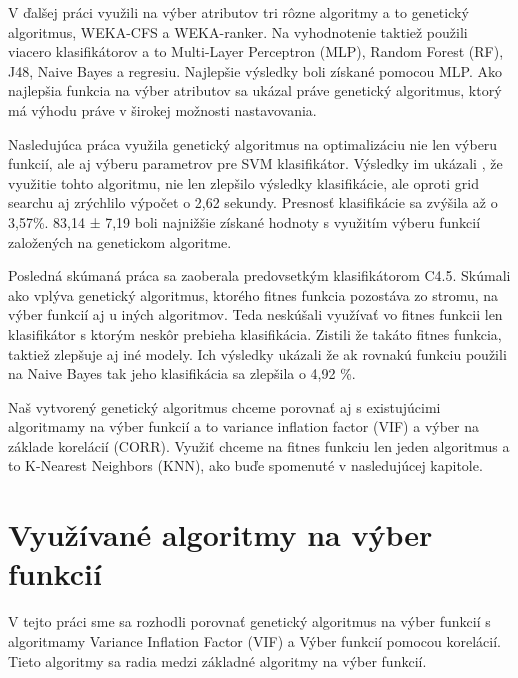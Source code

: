 \documentclass[runningheads]{llncs}
\begin{document}
V ďalšej práci\cite{ref_babatunde} využili na výber atributov tri rôzne algoritmy a to 
genetický algoritmus, WEKA-CFS a WEKA-ranker. Na vyhodnotenie taktiež použili viacero klasifikátorov
a to Multi-Layer Perceptron (MLP), Random Forest (RF), J48, Naive Bayes a regresiu. Najlepšie výsledky 
boli získané pomocou MLP. Ako najlepšia funkcia na výber atributov sa ukázal práve genetický algoritmus,
ktorý má výhodu práve v širokej možnosti nastavovania.

Nasledujúca práca\cite{ref_zhao} využila genetický algoritmus na optimalizáciu nie 
len výberu funkcií, ale aj výberu parametrov pre SVM klasifikátor. Výsledky im ukázali
, že využitie tohto algoritmu, nie len zlepšilo výsledky klasifikácie, 
ale oproti  grid searchu aj zrýchlilo výpočet o 2,62 sekundy.
Presnosť klasifikácie sa zvýšila až o 3,57\%. 83,14 ± 7,19 boli najnižšie 
získané hodnoty s využitím výberu funkcií založených na genetickom algoritme.

Posledná skúmaná práca \cite{ref_smith} sa zaoberala predovsetkým klasifikátorom C4.5.
Skúmali ako vplýva genetický algoritmus, ktorého fitnes funkcia pozostáva zo stromu, 
na výber funkcií aj u iných algoritmov. Teda neskúšali využívať vo fitnes funkcii len
klasifikátor s ktorým neskôr prebieha klasifikácia. Zistili že takáto fitnes funkcia,
taktiež zlepšuje aj iné modely. Ich výsledky ukázali že ak rovnakú funkciu použili na 
Naive Bayes tak jeho klasifikácia sa zlepšila o 4,92 \%.

Naš vytvorený genetický algoritmus chceme porovnať aj s existujúcimi algoritmamy na výber 
funkcií a to variance inflation factor (VIF) a výber na základe korelácií (CORR). Využiť chceme
na fitnes funkciu len jeden algoritmus a to K-Nearest Neighbors (KNN), ako buďe spomenuté v nasledujúcej kapitole.


\section{Využívané algoritmy na výber funkcií}
V tejto práci sme sa rozhodli porovnať genetický algoritmus na výber funkcií s
algoritmamy Variance Inflation Factor (VIF) a Výber funkcií pomocou korelácií. Tieto 
algoritmy sa radia medzi základné algoritmy na výber funkcií. \cite{ref_xu}
\end{document}
